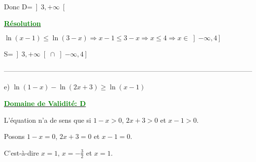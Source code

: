 \documentclass[12pt]{article}
\begin{document}
Donc D=$\left]3 , +\infty\right[ $

\textbf{\underline{\textcolor{green}{Résolution}}}

$\ln(x-1)\leq\ln(3-x)\Longrightarrow x-1\leq3-x\Longrightarrow x\leq4 \Longrightarrow x\in\left]-\infty , 4\right] $

S=$\left]3 , +\infty\right[\cap\left]-\infty , 4\right] $

\textcolor{green}{\boxed{S=\left]3; 4\right[}}

------------------------------------------------------------------------------------------------------------

e) $\ln(1-x)-\ln(2x+3)\geq\ln(x-1)$

\textbf{\underline{\textcolor{green}{Domaine de Validité: D}}}

L'équation n'a de sens que si $1-x>0$, $2x+3>0$ et $x-1>0$.

Posons $1-x=0$, $2x+3=0$ et $x-1=0$.

C'est-à-dire $x=1$, $x=-\frac{3}{2}$ et $x=1$.
\end{document}
